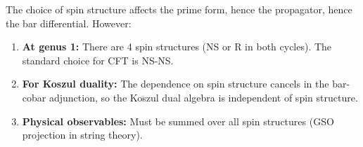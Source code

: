 \begin{theorem}\label{thm:spin-koszul}
The choice of spin structure affects the prime form, hence the propagator, hence 
the bar differential. However:

\begin{enumerate}
\item \textbf{At genus 1:} There are 4 spin structures (NS or R in both cycles). 
The standard choice for CFT is NS-NS.

\item \textbf{For Koszul duality:} The dependence on spin structure cancels in the 
bar-cobar adjunction, so the Koszul dual algebra is independent of spin structure.

\item \textbf{Physical observables:} Must be summed over all spin structures 
(GSO projection in string theory).
\end{enumerate}
\end{theorem}

